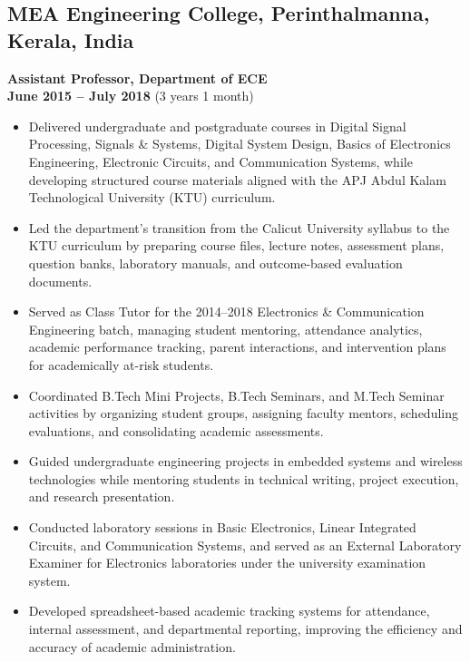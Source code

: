 \documentclass[a4paper,10pt]{article}
\begin{document}
\subsection{MEA Engineering College, Perinthalmanna, Kerala, India}
\textbf{Assistant Professor, Department of ECE} \\
\hfill \textbf{June 2015 -- July 2018} (3 years 1 month)

\begin{itemize}

\item Delivered undergraduate and postgraduate courses in Digital Signal Processing, Signals \& Systems, Digital System Design, Basics of Electronics Engineering, Electronic Circuits, and Communication Systems, while developing structured course materials aligned with the APJ Abdul Kalam Technological University (KTU) curriculum.

\item Led the department's transition from the Calicut University syllabus to the KTU curriculum by preparing course files, lecture notes, assessment plans, question banks, laboratory manuals, and outcome-based evaluation documents.

\item Served as Class Tutor for the 2014--2018 Electronics \& Communication Engineering batch, managing student mentoring, attendance analytics, academic performance tracking, parent interactions, and intervention plans for academically at-risk students.

\item Coordinated B.Tech Mini Projects, B.Tech Seminars, and M.Tech Seminar activities by organizing student groups, assigning faculty mentors, scheduling evaluations, and consolidating academic assessments.

\item Guided undergraduate engineering projects in embedded systems and wireless technologies while mentoring students in technical writing, project execution, and research presentation.

\item Conducted laboratory sessions in Basic Electronics, Linear Integrated Circuits, and Communication Systems, and served as an External Laboratory Examiner for Electronics laboratories under the university examination system.

\item Developed spreadsheet-based academic tracking systems for attendance, internal assessment, and departmental reporting, improving the efficiency and accuracy of academic administration.

\end{itemize}
\end{document}

